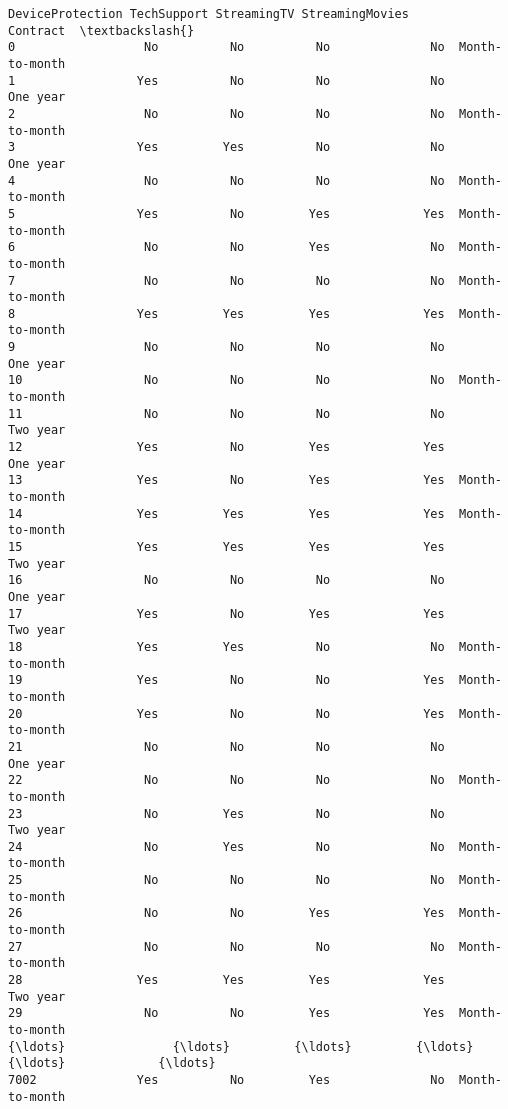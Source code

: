 \documentclass[11pt]{article}
\begin{document}
\begin{tcolorbox}[breakable, boxrule=.5pt, size=fbox, pad at break*=1mm, opacityfill=0]
\begin{Verbatim}[commandchars=\\\{\}]
     DeviceProtection TechSupport StreamingTV StreamingMovies        Contract  \textbackslash{}
0                  No          No          No              No  Month-to-month
1                 Yes          No          No              No        One year
2                  No          No          No              No  Month-to-month
3                 Yes         Yes          No              No        One year
4                  No          No          No              No  Month-to-month
5                 Yes          No         Yes             Yes  Month-to-month
6                  No          No         Yes              No  Month-to-month
7                  No          No          No              No  Month-to-month
8                 Yes         Yes         Yes             Yes  Month-to-month
9                  No          No          No              No        One year
10                 No          No          No              No  Month-to-month
11                 No          No          No              No        Two year
12                Yes          No         Yes             Yes        One year
13                Yes          No         Yes             Yes  Month-to-month
14                Yes         Yes         Yes             Yes  Month-to-month
15                Yes         Yes         Yes             Yes        Two year
16                 No          No          No              No        One year
17                Yes          No         Yes             Yes        Two year
18                Yes         Yes          No              No  Month-to-month
19                Yes          No          No             Yes  Month-to-month
20                Yes          No          No             Yes  Month-to-month
21                 No          No          No              No        One year
22                 No          No          No              No  Month-to-month
23                 No         Yes          No              No        Two year
24                 No         Yes          No              No  Month-to-month
25                 No          No          No              No  Month-to-month
26                 No          No         Yes             Yes  Month-to-month
27                 No          No          No              No  Month-to-month
28                Yes         Yes         Yes             Yes        Two year
29                 No          No         Yes             Yes  Month-to-month
{\ldots}               {\ldots}         {\ldots}         {\ldots}             {\ldots}             {\ldots}
7002              Yes          No         Yes              No  Month-to-month

\end{Verbatim}
\end{tcolorbox}
\end{document}
